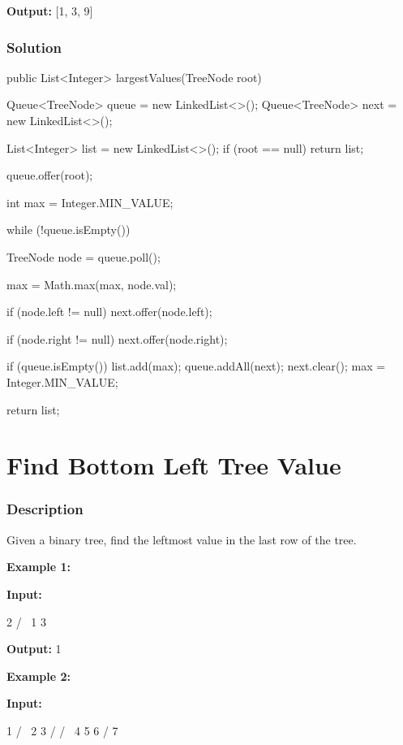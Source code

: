 \textbf{Output:} [1, 3, 9]

\subsubsection{Solution}

\begin{Code}
public List<Integer> largestValues(TreeNode root) {
    Queue<TreeNode> queue = new LinkedList<>();
    Queue<TreeNode> next = new LinkedList<>();

    List<Integer> list = new LinkedList<>();
    if (root == null) {
        return list;
    }

    queue.offer(root);

    int max = Integer.MIN_VALUE;

    while (!queue.isEmpty()) {
        TreeNode node = queue.poll();

        max = Math.max(max, node.val);

        if (node.left != null) {
            next.offer(node.left);
        }

        if (node.right != null) {
            next.offer(node.right);
        }

        if (queue.isEmpty()) {
            list.add(max);
            queue.addAll(next);
            next.clear();
            max = Integer.MIN_VALUE;
        }
    }

    return list;
}
\end{Code}

\newpage

\section{Find Bottom Left Tree Value} %

\subsubsection{Description}
Given a binary tree, find the leftmost value in the last row of the tree.

\textbf{Example 1:}

\textbf{Input:}
\begin{Code}
    2
   / \
  1   3
\end{Code}

\textbf{Output:} 1

\textbf{Example 2:}

\textbf{Input:}

\begin{Code}
        1
       / \
      2   3
     /   / \
    4   5   6
       /
      7
\end{Code}

